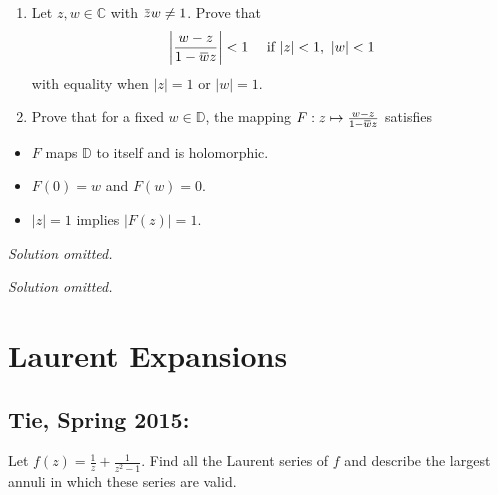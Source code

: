 \begin{problem}[?]

\envlist

\begin{enumerate}
\def\labelenumi{\alph{enumi}.}
\item
  Let \(z, w \in {\mathbb{C}}\) with
  \(\mkern 1.5mu\overline{\mkern-1.5muz\mkern-1.5mu}\mkern 1.5mu w \neq 1\).
  Prove that
  \begin{align*}
  {\left\lvert {w-z \over 1 - \mkern 1.5mu\overline{\mkern-1.5muw\mkern-1.5mu}\mkern 1.5mu z} \right\rvert} < 1 \quad\text{ if } {\left\lvert {z} \right\rvert}<1,~ {\left\lvert {w} \right\rvert} < 1
  \end{align*}
  with equality when \({\left\lvert {z} \right\rvert} = 1\) or
  \({\left\lvert {w} \right\rvert} = 1\).
\item
  Prove that for a fixed \(w\in {\mathbb{D}}\), the mapping
  \(F: z\mapsto {w-z \over 1 - \mkern 1.5mu\overline{\mkern-1.5muw\mkern-1.5mu}\mkern 1.5mu z}\)
  satisfies
\end{enumerate}

\begin{itemize}
\tightlist
\item
  \(F\) maps \({\mathbb{D}}\) to itself and is holomorphic.
\item
  \(F(0) = w\) and \(F(w) = 0\).
\item
  \({\left\lvert {z} \right\rvert} = 1\) implies
  \({\left\lvert {F(z)} \right\rvert} = 1\).
\end{itemize}

\end{problem}

\emph{Solution omitted.}

\emph{Solution omitted.}

\hypertarget{laurent-expansions}{%
\section{Laurent Expansions}\label{laurent-expansions}}

\hypertarget{tie-spring-2015}{%
\subsection{Tie, Spring 2015:}\label{tie-spring-2015}}

Let \(\displaystyle f(z) = \frac{1}{z} + \frac{1}{z^2 -1}\). Find all
the Laurent series of \(f\) and describe the largest annuli in which
these series are valid.

